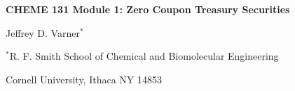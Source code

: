 \documentclass[11pt]{article}
\makeatletter
\theoremstyle{definition}
\renewcommand\subsection{\@startsection
	{subsection}{2}{0mm}
	{-0.05in}
	{0.5\baselineskip}
	{\normalfont\normalsize\bfseries}}
\makeatother
\begin{document}
{\par\centering\textbf{\Large CHEME 131 Module 1: Zero Coupon Treasury Securities}}
\vspace{0.2in}
{\par \centering \large{Jeffrey D. Varner$^{*}$}}
\vspace{0.1in}
{\par \centering \large{$^{*}$}R. F. Smith School of Chemical and Biomolecular Engineering}
{\par \centering \large{Cornell University, Ithaca NY 14853}}

\date{}
\thispagestyle{empty}

\setcounter{page}{1}



\end{document}
